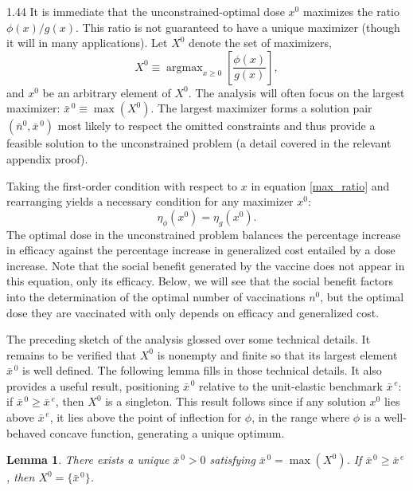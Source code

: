 \documentclass[12pt]{article}
\DeclareMathOperator*{\argmax}{argmax}
\newcommand{\efficacy}{\phi}
\newcommand{\general}{g}
\newcommand{\xunitbar}{\bar{x}^{\,e}}
\newcommand{\xno}{x^{0}}
\newcommand{\Xno}{X^{0}}
\newcommand{\xnobar}{\bar{x}^{\,0}}
\newcommand{\nno}{n^{0}}
\newcommand{\nnobar}{\bar{n}^{0}}
\newcommand{\elasticity}[1]{\eta_{#1}}
\newtheorem{lemma}{Lemma}
\begin{document}
\begin{spacing}{1.44}
It is immediate that the unconstrained-optimal dose $\xno$ maximizes
the ratio $\efficacy(x) / \general(x)$. This ratio is not guaranteed
to have a unique maximizer (though it will in many applications). Let
$\Xno$ denote the set of maximizers,
\begin{equation}
\label{max_ratio}
\Xno \equiv \argmax_{x \geq 0} \left[
  \frac{\efficacy(x)}{\general(x)} \right],
\end{equation}
and $\xno$ be an arbitrary element of $\Xno$. The analysis will often
focus on the largest maximizer: $\xnobar \equiv \max(\Xno)$. The
largest maximizer forms a solution pair $(\nnobar, \xnobar)$ most
likely to respect the omitted constraints and thus provide a feasible
solution to the unconstrained problem (a detail covered in the
relevant appendix proof).

Taking the first-order condition with respect to $x$ in equation
\eqref{max_ratio} and rearranging yields a necessary condition for any
maximizer $\xno$:
\begin{equation}
\label{equal_elasticities}
\elasticity{\efficacy}(\xno) = \elasticity{\general}(\xno). 
\end{equation}
The optimal dose in the unconstrained problem balances the percentage
increase in efficacy against the percentage increase in generalized
cost entailed by a dose increase. Note that the social benefit
generated by the vaccine does not appear in this equation, only its
efficacy. Below, we will see that the social benefit factors into the
determination of the optimal number of vaccinations $\nno$, but the
optimal dose they are vaccinated with only depends on efficacy and
generalized cost.

The preceding sketch of the analysis glossed over some technical
details. It remains to be verified that $\Xno$ is nonempty and finite
so that its largest element $\xnobar$ is well defined. The following
lemma fills in those technical details. It also provides a useful
result, positioning $\xnobar$ relative to the unit-elastic benchmark
$\xunitbar$: if $\xnobar \geq \xunitbar$, then $\Xno$ is a singleton. This
result follows since if any solution $\xno$ lies above $\xunitbar$, it
lies above the point of inflection for $\efficacy$, in the range where
$\efficacy$ is a well-behaved concave function, generating a unique
optimum.
\begin{lemma}
\label{l:xno}
\singlespace
There exists a unique $\xnobar > 0$ satisfying $\xnobar =
\max(\Xno)$. If $\xnobar \geq \xunitbar$, then $\Xno = \{ \xnobar \}$.
\end{lemma}


\end{spacing}
\end{document}
